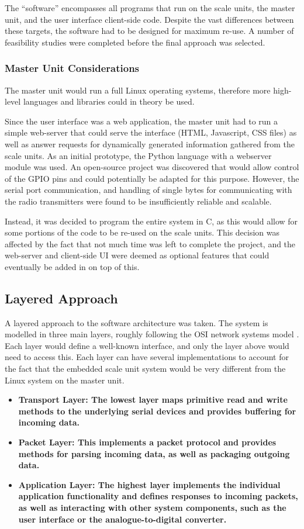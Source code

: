 The ``software'' encompasses all programs that run on the scale units, the master unit, and the user interface client-side code. Despite the vast differences between these targets, the software had to be designed for maximum re-use. A number of feasibility studies were completed before the final approach was selected.

\subsubsection{Master Unit Considerations}
The master unit would run a full Linux operating systems, therefore more high-level languages and libraries could in theory be used.

Since the user interface was a web application, the master unit had to run a simple web-server that could serve the interface (HTML, Javascript, CSS files) as well as answer requests for dynamically generated information gathered from the scale units. As an initial prototype, the Python language with a webserver module \cite{bottle-py} was used. An open-source project \cite{webiopi} was discovered that would allow control of the GPIO pins and could potentially be adapted for this purpose. However, the serial port communication, and handling of single bytes for communicating with the radio transmitters were found to be insufficiently reliable and scalable.

Instead, it was decided to program the entire system in C, as this would allow for some portions of the code to be re-used on the scale units. This decision was affected by the fact that not much time was left to complete the project, and the web-server and client-side UI were deemed as optional features that could eventually be added in on top of this.

\subsection{Layered Approach}
A layered approach to the software architecture was taken. The system is modelled in three main layers, roughly following the OSI network systems model \cite{osi-model}. Each layer would define a well-known interface, and only the layer above would need to access this. Each layer can have several implementations to account for the fact that the embedded scale unit system would be very different from the Linux system on the master unit.

\begin{itemize}
	\item \bf{Transport Layer:} The lowest layer maps primitive read and write methods to the underlying serial devices and provides buffering for incoming data.
	\item \bf{Packet Layer:} This implements a packet protocol and provides methods for parsing incoming data, as well as packaging outgoing data.
	\item \bf{Application Layer:} The highest layer implements the individual application functionality and defines responses to incoming packets, as well as interacting with other system components, such as the user interface or the analogue-to-digital converter.
\end{itemize}


